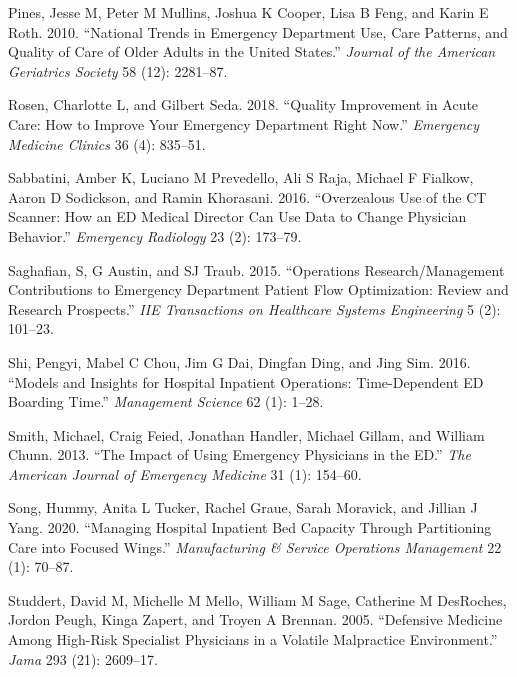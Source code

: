 \documentclass{article}
\newlength{\cslhangindent}
\newlength{\cslentryspacingunit} %
\newenvironment{CSLReferences}[2] %
 {%
  \setlength{\parindent}{0pt}
  \ifodd #1
  \let\oldpar\par
  \def\par{\hangindent=\cslhangindent\oldpar}
  \fi
  \setlength{\parskip}{#2\cslentryspacingunit}
 }%
 {}
\begin{document}
\begin{CSLReferences}{1}{0}
\leavevmode{}%
Pines, Jesse M, Peter M Mullins, Joshua K Cooper, Lisa B Feng, and Karin
E Roth. 2010. {``National Trends in Emergency Department Use, Care
Patterns, and Quality of Care of Older Adults in the United States.''}
\emph{Journal of the American Geriatrics Society} 58 (12): 2281--87.

\leavevmode{}%
Rosen, Charlotte L, and Gilbert Seda. 2018. {``Quality Improvement in
Acute Care: How to Improve Your Emergency Department Right Now.''}
\emph{Emergency Medicine Clinics} 36 (4): 835--51.

\leavevmode{}%
Sabbatini, Amber K, Luciano M Prevedello, Ali S Raja, Michael F Fialkow,
Aaron D Sodickson, and Ramin Khorasani. 2016. {``Overzealous Use of the
CT Scanner: How an ED Medical Director Can Use Data to Change Physician
Behavior.''} \emph{Emergency Radiology} 23 (2): 173--79.

\leavevmode{}%
Saghafian, S, G Austin, and SJ Traub. 2015. {``Operations
Research/Management Contributions to Emergency Department Patient Flow
Optimization: Review and Research Prospects.''} \emph{IIE Transactions
on Healthcare Systems Engineering} 5 (2): 101--23.

\leavevmode{}%
Shi, Pengyi, Mabel C Chou, Jim G Dai, Dingfan Ding, and Jing Sim. 2016.
{``Models and Insights for Hospital Inpatient Operations: Time-Dependent
ED Boarding Time.''} \emph{Management Science} 62 (1): 1--28.

\leavevmode{}%
Smith, Michael, Craig Feied, Jonathan Handler, Michael Gillam, and
William Chunn. 2013. {``The Impact of Using Emergency Physicians in the
ED.''} \emph{The American Journal of Emergency Medicine} 31 (1):
154--60.

\leavevmode{}%
Song, Hummy, Anita L Tucker, Rachel Graue, Sarah Moravick, and Jillian J
Yang. 2020. {``Managing Hospital Inpatient Bed Capacity Through
Partitioning Care into Focused Wings.''} \emph{Manufacturing \& Service
Operations Management} 22 (1): 70--87.

\leavevmode{}%
Studdert, David M, Michelle M Mello, William M Sage, Catherine M
DesRoches, Jordon Peugh, Kinga Zapert, and Troyen A Brennan. 2005.
{``Defensive Medicine Among High-Risk Specialist Physicians in a
Volatile Malpractice Environment.''} \emph{Jama} 293 (21): 2609--17.


\end{CSLReferences}
\end{document}
